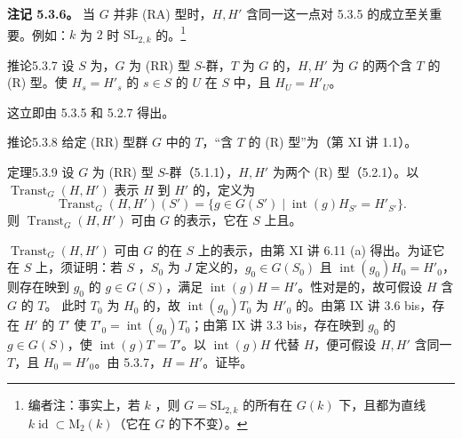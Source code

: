 \textbf{注记 5.3.6。} 当 $G$ 并非 (RA) 型时，$H,H'$ 含同一这一点对 5.3.5 的成立至关重要。例如：$k$ 为 $2$ 时 $\mathrm{SL}_{2,k}$ 的。\footnote{编者注：事实上，若 $k$ ，则 $G=\mathrm{SL}_{2,k}$ 的所有在 $G(k)$ 下，且都为直线 $k\operatorname{id}\subset\mathrm M_2(k)$（它在 $G$ 的下不变）。}
\begin{SGAresult}{推论}{5.3.7} 设 $S$ 为，$G$ 为 (RR) 型 $S$-群，$T$ 为 $G$ 的，$H,H'$ 为 $G$ 的两个含 $T$ 的 (R) 型。使 $H_s=H'_s$ 的 $s\in S$ 的 $U$ 在 $S$ 中，且 $H_U=H'_U$。\end{SGAresult}
这立即由 5.3.5 和 5.2.7 得出。
\begin{SGAresult}{推论}{5.3.8} 给定 (RR) 型群 $G$ 中的 $T$，“含 $T$ 的 (R) 型”为（第 XI 讲 1.1）。\end{SGAresult}
\begin{SGAresult}{定理}{5.3.9} 设 $G$ 为 (RR) 型 $S$-群（5.1.1），$H,H'$ 为两个 (R) 型（5.2.1）。以 $\operatorname{Transt}_G(H,H')$ 表示 $H$ 到 $H'$ 的，定义为
\[\operatorname{Transt}_G(H,H')(S')=\{g\in G(S')\mid\operatorname{int}(g)H_{S'}=H'_{S'}\}.\]
则 $\operatorname{Transt}_G(H,H')$ 可由 $G$ 的表示，它在 $S$ 上且。
\end{SGAresult}
$\operatorname{Transt}_G(H,H')$ 可由 $G$ 的在 $S$ 上的表示，由第 XI 讲 6.11 (a) 得出。为证它在 $S$ 上，须证明：若 $S$ ，$S_0$ 为 $J$ 定义的，$g_0\in G(S_0)$ 且 $\operatorname{int}(g_0)H_0=H'_0$，则存在映到 $g_0$ 的 $g\in G(S)$，满足 $\operatorname{int}(g)H=H'$。性对是的，故可假设 $H$ 含 $G$ 的 $T$。
此时 $T_0$ 为 $H_0$ 的，故 $\operatorname{int}(g_0)T_0$ 为 $H'_0$ 的。由第 IX 讲 3.6 bis，存在 $H'$ 的 $T'$ 使 $T'_0=\operatorname{int}(g_0)T_0$；由第 IX 讲 3.3 bis，存在映到 $g_0$ 的 $g\in G(S)$，使 $\operatorname{int}(g)T=T'$。以 $\operatorname{int}(g)H$ 代替 $H$，便可假设 $H,H'$ 含同一 $T$，且 $H_0=H'_0$。由 5.3.7，$H=H'$。证毕。
